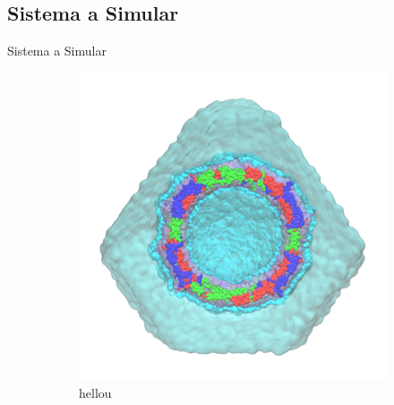 \documentclass[8pt]{beamer}
\begin{document}
\subsection{Sistema a Simular}
\begin{frame}[t]{Sistema a Simular}

\begin{figure}[ht]
\vspace{-0.4cm}
\centering
\hspace*{\fill}
\begin{subfigure}[t]{.46\textwidth}
  \centering
  \includegraphics[width=1\textwidth]{Figure/TrV_Capsid_WaterBox.png}
  \vspace{-0.5cm}
  \caption*{hellou}
  \label{fig:trv_capsid_waterbox}
\end{subfigure}
\hspace*{\fill}
\begin{subfigure}[t]{.46\textwidth}
  \centering

\end{subfigure}
\end{figure}
\end{frame}
\end{document}
